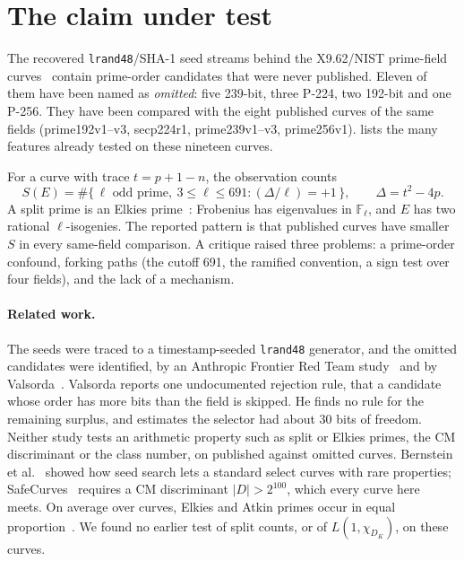 \documentclass[11pt,a4paper]{article}
\theoremstyle{plain}
\newcommand{\FF}{\mathbb{F}}
\begin{document}
\section{The claim under test}

The recovered \texttt{lrand48}/SHA-1 seed streams behind the X9.62/NIST
prime-field curves~\cite{x962draft1997} contain prime-order candidates that
were never published. Eleven of them have been named as \emph{omitted}: five
239-bit, three P-224, two 192-bit and one P-256. They have been compared with
the eight published curves of the same fields (prime192v1--v3, secp224r1,
prime239v1--v3, prime256v1).
lists the many features already tested on these nineteen curves.

For a curve with trace $t = p + 1 - n$, the observation counts
\begin{equation}
  S(E) = \#\{\, \ell \text{ odd prime},\ 3 \le \ell \le 691 : (\Delta/\ell) = +1 \,\},
  \qquad \Delta = t^2 - 4p .
\end{equation}
A split prime is an Elkies prime~\cite{schoof1995}: Frobenius has eigenvalues
in $\FF_\ell$, and $E$ has two rational $\ell$-isogenies. The reported pattern
is that published curves have smaller $S$ in every same-field comparison. A
critique raised three problems: a prime-order confound, forking paths (the
cutoff 691, the ramified convention, a sign test over four fields), and the
lack of a mechanism.

\paragraph{Related work.} The seeds were traced to a timestamp-seeded
\texttt{lrand48} generator, and the omitted candidates were identified, by an
Anthropic Frontier Red Team study~\cite{anthropic2026seeds} and by
Valsorda~\cite{valsorda2026seeds}. Valsorda reports one undocumented
rejection rule, that a candidate whose order has more bits than the field is
skipped. He finds no rule for the remaining surplus, and estimates the
selector had about 30 bits of freedom. Neither study tests an arithmetic
property such as split or Elkies primes, the CM discriminant or the class
number, on published against omitted curves. Bernstein et al.~\cite{bada55}
showed how seed search lets a standard select curves with rare properties;
SafeCurves~\cite{safecurves} requires a CM discriminant
$|D| > 2^{100}$, which every curve here meets. On average over curves, Elkies
and Atkin primes occur in equal proportion~\cite{shparlinski-sutherland}. We
found no earlier test of split counts, or of $L(1,\chi_{D_K})$, on these
curves.
\end{document}
